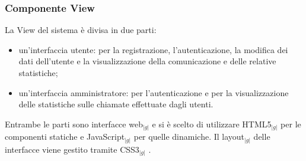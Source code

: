 \subsubsection{Componente View}
\noindent La View del sistema è divisa in due parti:
\begin{itemize}
\item un'interfaccia utente: per la registrazione, l'autenticazione, la modifica dei dati dell'utente e la visualizzazione della comunicazione e delle relative statistiche;
\item un'interfaccia amministratore: per l'autenticazione e per la visualizzazione delle statistiche sulle chiamate effettuate dagli utenti.
\end{itemize}
\noindent Entrambe le parti sono interfacce web$_{|g|}$ e si è scelto di utilizzare HTML5$_{|g|}$ per le componenti statiche e JavaScript$_{|g|}$ per quelle dinamiche. Il layout$_{|g|}$ delle interfacce viene gestito tramite CSS3$_{|g|}$ .

